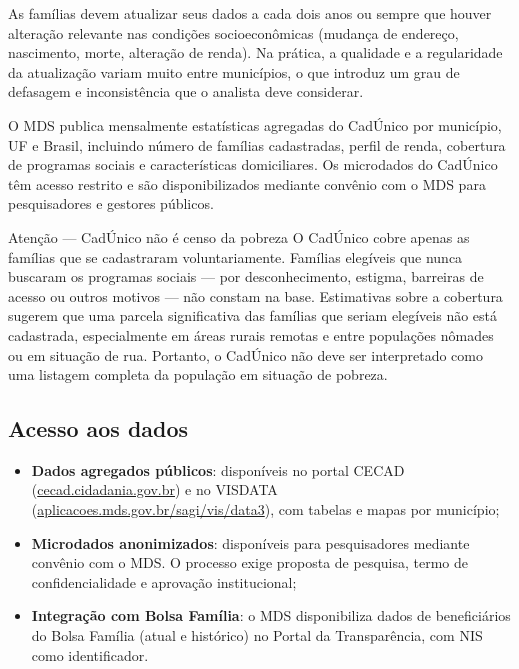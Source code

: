 As famílias devem atualizar seus dados a cada dois anos ou sempre que houver alteração relevante nas condições socioeconômicas (mudança de endereço, nascimento, morte, alteração de renda). Na prática, a qualidade e a regularidade da atualização variam muito entre municípios, o que introduz um grau de defasagem e inconsistência que o analista deve considerar.

O MDS publica mensalmente estatísticas agregadas do CadÚnico por município, UF e Brasil, incluindo número de famílias cadastradas, perfil de renda, cobertura de programas sociais e características domiciliares. Os microdados do CadÚnico têm acesso restrito e são disponibilizados mediante convênio com o MDS para pesquisadores e gestores públicos.

\begin{boxatencao}{Atenção — CadÚnico não é censo da pobreza}
O CadÚnico cobre apenas as famílias que se cadastraram voluntariamente. Famílias elegíveis que nunca buscaram os programas sociais — por desconhecimento, estigma, barreiras de acesso ou outros motivos — não constam na base. Estimativas sobre a cobertura sugerem que uma parcela significativa das famílias que seriam elegíveis não está cadastrada, especialmente em áreas rurais remotas e entre populações nômades ou em situação de rua. Portanto, o CadÚnico não deve ser interpretado como uma listagem completa da população em situação de pobreza.
\end{boxatencao}

\subsection{Acesso aos dados}

\begin{itemize}
  \item \textbf{Dados agregados públicos}: disponíveis no portal CECAD (\url{cecad.cidadania.gov.br}) e no VISDATA (\url{aplicacoes.mds.gov.br/sagi/vis/data3}), com tabelas e mapas por município;
  \item \textbf{Microdados anonimizados}: disponíveis para pesquisadores mediante convênio com o MDS. O processo exige proposta de pesquisa, termo de confidencialidade e aprovação institucional;
  \item \textbf{Integração com Bolsa Família}: o MDS disponibiliza dados de beneficiários do Bolsa Família (atual e histórico) no Portal da Transparência, com NIS como identificador.
\end{itemize}

